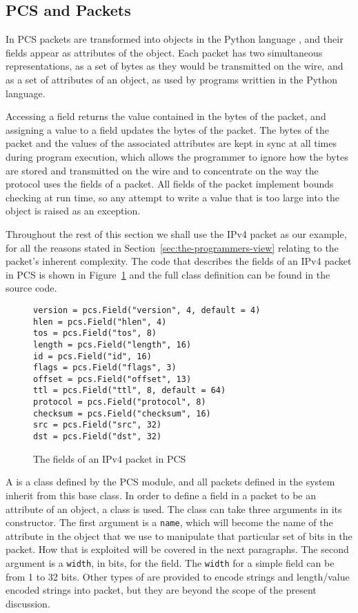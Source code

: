 \documentclass{sig-alternate-10pt}
\begin{document}
\subsection{PCS and Packets}
\label{sec:pcs-and-packets}

In PCS packets are transformed into objects in the Python language
\cite{vanRossum}, and their fields appear as attributes of the
object.  Each packet has two simultaneous representations, as a set of
bytes as they would be transmitted on the wire, and as a set of
attributes of an object, as used by programs writtien in the Python
language.

Accessing a field returns the value contained in the bytes of the
packet, and assigning a value to a field updates the bytes of the
packet.  The bytes of the packet and the values of the associated
attributes are kept in sync at all times during program execution,
which allows the programmer to ignore how the bytes are stored and
transmitted on the wire and to concentrate on the way the protocol
uses the fields of a packet.  All fields of the packet implement
bounds checking at run time, so any attempt to write a value that is
too large into the object is raised as an exception.  

Throughout the rest of this section we shall use the IPv4 packet as
our example, for all the reasons stated in
Section~\ref{sec:the-programmers-view} relating to the packet's
inherent complexity.  The code that describes the fields of an IPv4
packet in PCS is shown in Figure~\ref{fig:ipv4-packet-in-pcs} and the
full class definition can be found in the source code\cite{}.

\begin{figure}
  \centering
\begin{verbatim}
version = pcs.Field("version", 4, default = 4)
hlen = pcs.Field("hlen", 4)
tos = pcs.Field("tos", 8)
length = pcs.Field("length", 16)
id = pcs.Field("id", 16)
flags = pcs.Field("flags", 3)
offset = pcs.Field("offset", 13)
ttl = pcs.Field("ttl", 8, default = 64)
protocol = pcs.Field("protocol", 8)
checksum = pcs.Field("checksum", 16)
src = pcs.Field("src", 32)
dst = pcs.Field("dst", 32)
\end{verbatim}
  \caption{The fields of an IPv4 packet in PCS}
  \label{fig:ipv4-packet-in-pcs}
\end{figure}

A  is a class defined by the PCS module, and all packets
defined in the system inherit from this base class.  In order to
define a field in a packet to be an attribute of an object, a
 class is used.  The  class can take three
arguments in its constructor.  The first argument is a \verb|name|,
which will become the name of the attribute in the object that we use
to manipulate that particular set of bits in the packet.  How that is
exploited will be covered in the next paragraphs.  The second argument
is a \verb|width|, in bits, for the field.  The \verb|width| for a
simple field can be from 1 to 32 bits.  Other types of 
are provided to encode strings and length/value encoded strings into
packet, but they are beyond the scope of the present discussion.
\end{document}
